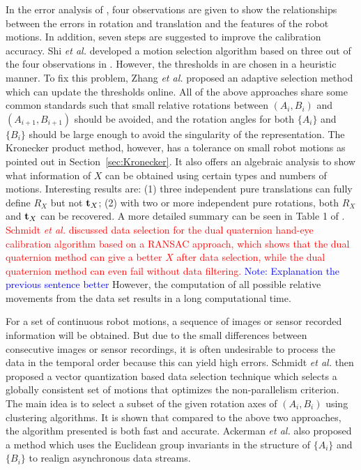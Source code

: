 \documentclass[twocolumn,10pt]{asme2ej}
\newcommand{\ttt}{{\bf t}}
\begin{document}
In the error analysis of \cite{tsai1989new}, four observations are given to show the relationships between the errors in rotation and translation and the features of the robot motions. In addition, seven steps are suggested to improve the calibration accuracy. Shi {\it{et al.}} \cite{shi2005approach} developed a motion selection algorithm based on three out of the four observations in \cite{tsai1989new}. However, the thresholds in \cite{shi2005approach} are chosen in a heuristic manner. To fix this problem,  Zhang {\it{et al.}} \cite{zhang2005adaptive} proposed an adaptive selection method which can update the thresholds online. All of the above approaches share some common standards such that small relative rotations between $(A_i, B_i)$ and $(A_{i+1}, B_{i+1})$ should be avoided, and the rotation angles for both $\{A_i\}$ and $\{B_i\}$ should be large enough to avoid the singularity of the representation. The Kronecker product method, however, has a tolerance on small robot motions as pointed out in Section~\ref{sec:Kronecker}. It also offers an algebraic analysis to show what information of $X$ can be obtained using certain types and numbers of motions. Interesting results are: (1) three independent pure translations can fully define $R_X$ but not $\ttt_{X}$; (2) with two or more independent pure rotations, both $R_{X}$ and $\ttt_{X}$ can be recovered. A more detailed summary can be seen in Table 1 of \cite{andreff1999line}. \textcolor{red}{Schmidt {\it{et al.}} \cite{schmidt2003robust} discussed data selection for the dual quaternion hand-eye calibration algorithm based on a RANSAC approach, which shows that the dual quaternion method can give a better $X$ after data selection, while the dual quaternion method can even fail without data filtering.} \textcolor{blue}{Note: Explanation the previous sentence better} However, the computation of all possible relative movements from the data set results in a long computational time. 

For a set of continuous robot motions, a sequence of images or sensor recorded information will be obtained. But due to the small differences between consecutive images or sensor recordings, it is often undesirable to process the data in the temporal order because this can yield high errors. Schmidt {\it{et al.}} \cite{vogt2004vector} then proposed a vector quantization based data selection technique which selects a globally consistent set of motions that optimizes the non-parallelism criterion. The main idea is to select a subset of the given rotation axes of $(A_i, B_i)$ using clustering algorithms. It is shown that compared to the above two approaches, the algorithm presented is both fast and accurate. Ackerman {\it{et al.}} \cite{ackermanIROS2013} also proposed a method which uses the Euclidean group invariants in the structure of $\{A_i\}$ and $\{B_i\}$ to realign asynchronous data streams.
\end{document}
